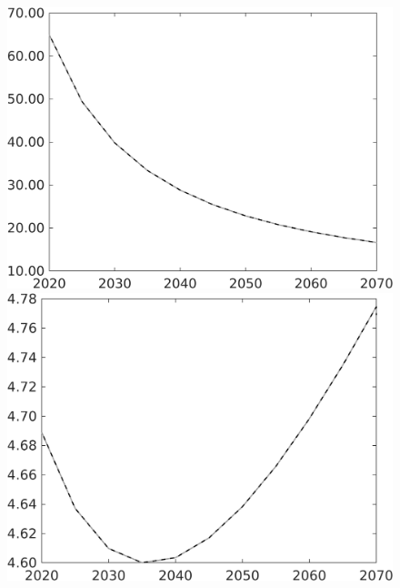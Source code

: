 \documentclass[12pt]{article}
\begin{document}
\begin{figure}[h!!]
\begin{minipage}[]{0.32\textwidth}
	\end{minipage}	
	\begin{minipage}[]{0.32\textwidth}
		\includegraphics[width=1\textwidth]{../../codding_model/own_basedOnFried/optimalPol_010922_revision/figures/all_13Sept22/CompTaul_Equlab_LFBAU_Reg0_gAg_spillover0_nsk1_xgr0_knspil0_sep1_countec0_GovRev0_etaa0.79_lgd0.png}
	\end{minipage}	
	\begin{minipage}[]{0.32\textwidth}
		\includegraphics[width=1\textwidth]{../../codding_model/own_basedOnFried/optimalPol_010922_revision/figures/all_13Sept22/CompTaul_Equlab_LFBAU_Reg0_gAf_spillover0_nsk1_xgr0_knspil0_sep1_countec0_GovRev0_etaa0.79_lgd0.png}

\end{minipage}
\end{figure}
\end{document}

